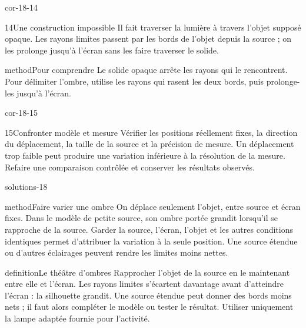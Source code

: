 \documentclass[12pt,twoside,openany]{book}
\begin{document}
\begin{blocLivre}{cor-18-14}
\begin{corrige}{14}{Une construction impossible}
Il fait traverser la lumière à travers l’objet supposé opaque. Les rayons limites passent par les bords de l’objet depuis la source ; on les prolonge jusqu’à l’écran sans les faire traverser le solide.\par
\begin{pcEncadre}{method}{Pour comprendre}
Le solide opaque arrête les rayons qui le rencontrent. Pour délimiter l’ombre, utilise les rayons qui rasent les deux bords, puis prolonge-les jusqu’à l’écran.\par
\end{pcEncadre}
\end{corrige}\end{blocLivre}
\begin{blocLivre}{cor-18-15}
\begin{corrige}{15}{Confronter modèle et mesure}
Vérifier les positions réellement fixes, la direction du déplacement, la taille de la source et la précision de mesure. Un déplacement trop faible peut produire une variation inférieure à la résolution de la mesure. Refaire une comparaison contrôlée et conserver les résultats observés.\par
\end{corrige}\end{blocLivre}
\label{solutions-18}
\begin{pcFiche}{solutions-18}
\begin{pcEncadre}{method}{Faire varier une ombre}
On déplace seulement l’objet, entre source et écran fixes. Dans le modèle de petite source, son ombre portée grandit lorsqu’il se rapproche de la source. Garder la source, l’écran, l’objet et les autres conditions identiques permet d’attribuer la variation à la seule position. Une source étendue ou d’autres éclairages peuvent rendre les limites moins nettes.\par
\end{pcEncadre}
\label{defi-cor-18}
\begin{pcEncadre}{definition}{Le théâtre d’ombres}
Rapprocher l’objet de la source en le maintenant entre elle et l’écran. Les rayons limites s’écartent davantage avant d’atteindre l’écran : la silhouette grandit. Une source étendue peut donner des bords moins nets ; il faut alors compléter le modèle ou tester le résultat. Utiliser uniquement la lampe adaptée fournie pour l’activité.\par
\end{pcEncadre}
\end{pcFiche}
\end{document}
